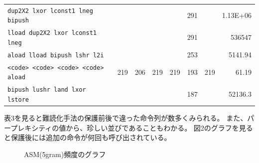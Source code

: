 \documentclass[a4j,fleqn,10pt]{jarticle}
\begin{document}
\begin{table}[t]
{\begin{tabular}{lrrrrrrr}
    \texttt{dup2X2 lxor lconst1 lneg bipush}   &     &     &     &     & 291 &     & 1.13E+06 \\
    \texttt{lload dup2X2 lxor lconst1 lneg}    &     &     &     &     & 291 &     & 536547 \\
    \texttt{aload lload bipush lshr l2i}       &     &     &     &     & 253 &     & 5141.94 \\
    \texttt{<code> <code> <code> <code> aload} & 219 & 206 & 219 & 219 & 193 & 219 & 61.19 \\
    \texttt{bipush lushr land lxor lstore}     &     &     &     &     & 187 &     & 52136.3 \\
  \end{tabular}}
\end{table}



表3を見ると難読化手法の保護前後で違った命令列が数多くみられる。
また、パープレキシティの値から、珍しい並びであることもわかる。
図2のグラフを見ると保護後には追加の命令が何回も呼び出されている。

\begin{figure}[b]
  \centering
  \begin{minipage}[t]{0.49\textwidth}
  \end{minipage}
  \caption{ASM(5gram)頻度のグラフ}\label{fig:graph}
\end{figure}
\end{document}
